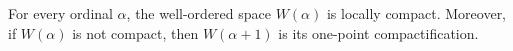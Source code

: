 For every ordinal $\alpha$, the well-ordered space $W(\alpha)$ is locally compact. Moreover, if $W(\alpha)$ is not compact, then $W(\alpha + 1)$ is its one-point compactification.
